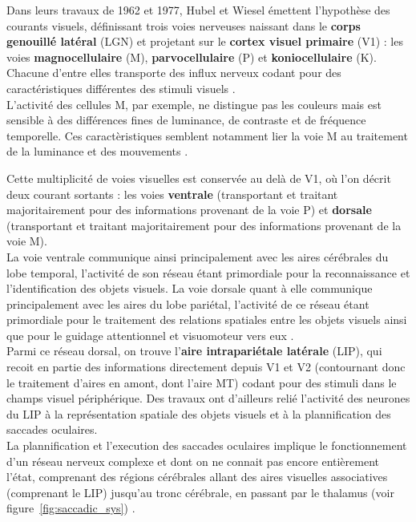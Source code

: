 Dans leurs travaux de 1962 et 1977, Hubel et Wiesel émettent l'hypothèse des courants visuels, définissant trois voies nerveuses naissant dans le \textbf{corps genouillé latéral} (LGN) et projetant sur le \textbf{cortex visuel primaire} (V1) :  les voies \textbf{magnocellulaire} (M),  \textbf{parvocellulaire} (P) et  \textbf{koniocellulaire} (K). Chacune d'entre elles transporte des influx nerveux codant pour des caractéristiques différentes des stimuli visuels \autocite{Denison2014, Werner2014}.\\
L'activité des cellules M, par exemple, ne distingue pas les couleurs mais est sensible à des différences fines de luminance, de contraste et de fréquence temporelle. Ces caractèristiques semblent notamment lier la voie M au traitement de la luminance et des mouvements \autocite{Denison2014, Werner2014}.

Cette multiplicité de voies visuelles est conservée au delà de V1, où l'on décrit deux courant sortants : les voies \textbf{ventrale} (transportant et traitant majoritairement pour des informations provenant de la voie P) et \textbf{dorsale} (transportant et traitant majoritairement pour des informations provenant de la voie M)\autocite{Werner2014, Freeman2011, Goodale2004}.\\
La voie ventrale communique ainsi principalement avec les aires cérébrales du lobe temporal, l'activité de son réseau étant primordiale pour la reconnaissance et l'identification des objets visuels. La voie dorsale quant à elle communique principalement avec les aires du lobe pariétal, l'activité de ce réseau étant primordiale pour le traitement des relations spatiales entre les objets visuels ainsi que pour le guidage attentionnel et visuomoteur vers eux \autocite{Werner2014, Freeman2011, Goodale2004}.\\
Parmi ce réseau dorsal, on trouve l'\textbf{aire intrapariétale latérale} (LIP), qui recoit en partie des informations directement depuis V1 et V2 (contournant donc le traitement d'aires en amont, dont l'aire MT) codant pour des stimuli dans le champs visuel périphérique. Des travaux ont d'ailleurs relié l'activité des neurones du LIP à la représentation spatiale des objets visuels et à la plannification des saccades oculaires\autocite{Werner2014}.\\
La plannification et l'execution des saccades oculaires implique le fonctionnement d'un réseau nerveux complexe et dont on ne connait pas encore entièrement l'état, comprenant des régions cérébrales allant des aires visuelles associatives (comprenant le LIP) jusqu'au tronc cérébrale, en passant par le thalamus (voir figure~\ref{fig:saccadic_sys}) \autocite{Zhaoping2014}.

